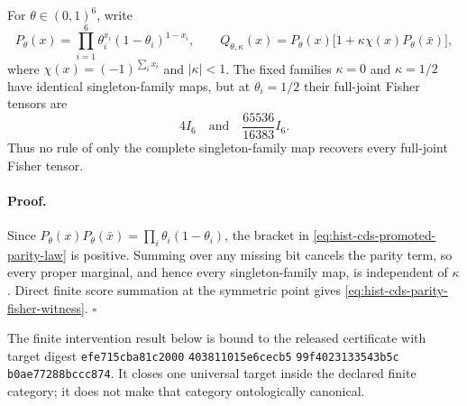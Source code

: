 For \(\theta\in(0,1)^6\), write
\begin{equation}
P_\theta(x)=\prod_{i=1}^6\theta_i^{x_i}(1-\theta_i)^{1-x_i},
\qquad
Q_{\theta,\kappa}(x)
=P_\theta(x)\bigl[1+\kappa\chi(x)P_\theta(\bar x)\bigr],
\label{eq:hist-cds-promoted-parity-law}
\end{equation}
where \(\chi(x)=(-1)^{\sum_i x_i}\) and \(|\kappa|<1\).  The fixed
families \(\kappa=0\) and \(\kappa=1/2\) have identical singleton-family
maps, but at \(\theta_i=1/2\) their full-joint Fisher tensors are
\begin{equation}
4I_6
\quad\text{and}\quad
\frac{65536}{16383}I_6.
\label{eq:hist-cds-parity-fisher-witness}
\end{equation}
Thus no rule of only the complete singleton-family map recovers every
full-joint Fisher tensor.  

\paragraph{Proof.}
Since \(P_\theta(x)P_\theta(\bar x)=\prod_i\theta_i(1-\theta_i)\), the
bracket in \eqref{eq:hist-cds-promoted-parity-law} is positive.  Summing over
any missing bit cancels the parity term, so every proper marginal, and hence
every singleton-family map, is independent of \(\kappa\).  Direct finite
score summation at the symmetric point gives
\eqref{eq:hist-cds-parity-fisher-witness}.  \(\square\)

The finite intervention result below is bound to the released certificate
with target digest
\texttt{efe715cba81c2000}\allowbreak%
\texttt{403811015e6cecb5}\allowbreak%
\texttt{99f4023133543b5c}\allowbreak%
\texttt{b0ae77288bccc874}.
It closes one universal target inside the declared finite category; it does
not make that category ontologically canonical.  

